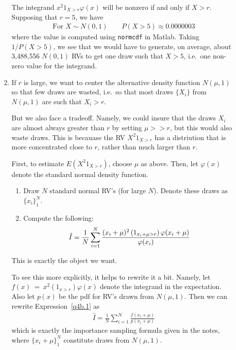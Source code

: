\documentclass[12pt]{article}
\theoremstyle{plain}
\theoremstyle{definition}
\theoremstyle{remark}
\begin{document}
\begin{enumerate}
\begin{enumerate}
        The integrand $x^2 1_{X>r}\varphi(x)$ will be nonzero if and
        only if $X>r$. Supposing that $r=5$, we have
        \begin{align*}
          \text{For $X\sim N(0,1)$}
          \qquad
          P(X>5) \approx 0.0000003
        \end{align*}
        where the value is computed using \texttt{normcdf} in
        Matlab. Taking $1/P(X>5)$, we see that we would have to
        generate, on average, about 3,488,556 $N(0,1)$ RVs to get one
        draw such that $X>5$, i.e.\ one non-zero value for the
        integrand.

      \item %
        If $r$ is large, we want to center the alternative density
        function $N(\mu,1)$ so that few draws are wasted, i.e.\ so that
        most draws $\{X_i\}$ from $N(\mu,1)$ are such that $X_i>r$.

        But we also face a tradeoff. Namely, we could insure that the
        draws $X_i$ are almost always greater than $r$ by setting
        $\mu>>r$, but this would also waste draws. This is becauase the
        RV $X^2 1_{X>r}$ has a distriution that is more concentrated
        close to $r$, rather than much larger than $r$.

        First, to estimate $E(X^2 1_{X>r})$, choose $\mu$ as above.
        Then, let $\varphi(x)$ denote the standard normal density
        function.
        \begin{enumerate}
          \item Draw $N$ standard normal RV's (for large $N$).  Denote
            these draws as $\{x_i\}^N_1$.
          \item Compute the following:
            \begin{align}
              \hat{I} = \frac{1}{N}
              \sum^N_{i=1} \frac{%
              (x_i+\mu)^2 \left(1_{x_i+\mu > r}\right) \varphi(x_i+\mu)}{%
                \varphi(x_i)}
              \label{q4b.1}
            \end{align}
        \end{enumerate}
        This is exactly the object we want.

        To see this more explicitly, it helps to rewrite it a bit.
        Namely, let $f(x)~=~x^2 (1_{x>r})\varphi(x)$ denote the
        integrand in the expectation. Also let $p(x)$ be the pdf for
        RV's drawn from $N(\mu,1)$.  Then we can rewrite
        Expression~\ref{q4b.1} as
        \begin{align*}
          \hat{I} = \frac{1}{N}\sum^N_{i=1}
          \frac{f(x_i+\mu)}{p(x_i+\mu)}
        \end{align*}
        which is exactly the importance sampling formula given in
        the notes, where $\{x_i+\mu\}_1^N$ constitute draws from
        $N(\mu,1)$.


\end{enumerate}
\end{enumerate}
\end{document}
